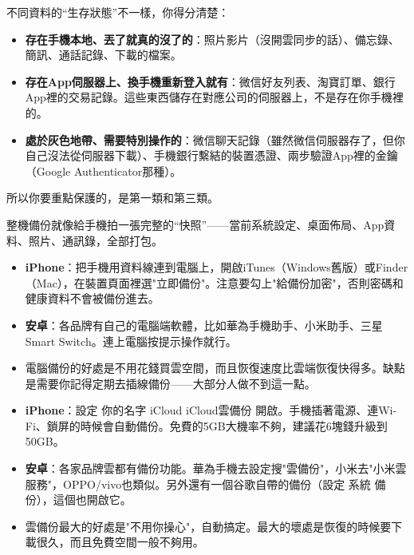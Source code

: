 


不同資料的“生存狀態”不一樣，你得分清楚：

\begin{itemize}
  \item \textbf{存在手機本地、丟了就真的沒了的}：照片影片（沒開雲同步的話）、備忘錄、簡訊、通話記錄、下載的檔案。
  \item \textbf{存在App伺服器上、換手機重新登入就有}：微信好友列表、淘寶訂單、銀行App裡的交易記錄。這些東西儲存在對應公司的伺服器上，不是存在你手機裡的。
  \item \textbf{處於灰色地帶、需要特別操作的}：微信聊天記錄（雖然微信伺服器存了，但你自己沒法從伺服器下載）、手機銀行繫結的裝置憑證、兩步驗證App裡的金鑰（Google Authenticator那種）。
\end{itemize}

所以你要重點保護的，是第一類和第三類。


整機備份就像給手機拍一張完整的“快照”——當前系統設定、桌面佈局、App資料、照片、通訊錄，全部打包。


\begin{itemize}
  \item \textbf{iPhone}：把手機用資料線連到電腦上，開啟iTunes（Windows舊版）或Finder（Mac），在裝置頁面裡選"立即備份"。注意要勾上"給備份加密"，否則密碼和健康資料不會被備份進去。
  \item \textbf{安卓}：各品牌有自己的電腦端軟體，比如華為手機助手、小米助手、三星Smart Switch。連上電腦按提示操作就行。
  \item 電腦備份的好處是不用花錢買雲空間，而且恢復速度比雲端恢復快得多。缺點是需要你記得定期去插線備份——大部分人做不到這一點。
\end{itemize}


\begin{itemize}
  \item \textbf{iPhone}：設定 你的名字 iCloud iCloud雲備份 開啟。手機插著電源、連Wi-Fi、鎖屏的時候會自動備份。免費的5GB大機率不夠，建議花6塊錢升級到50GB。
  \item \textbf{安卓}：各家品牌雲都有備份功能。華為手機去設定搜"雲備份"，小米去"小米雲服務"，OPPO/vivo也類似。另外還有一個谷歌自帶的備份（設定 系統 備份），這個也開啟它。
  \item 雲備份最大的好處是"不用你操心"，自動搞定。最大的壞處是恢復的時候要下載很久，而且免費空間一般不夠用。
\end{itemize}

